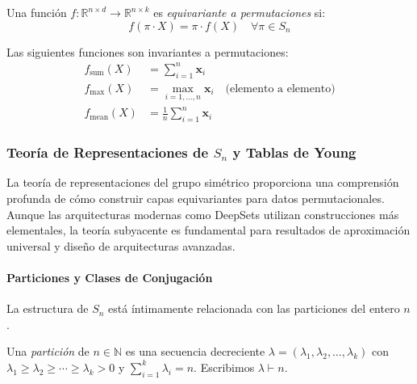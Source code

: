 \begin{definition}\label{def:permutation_equivariant_function}
Una función $f: \mathbb{R}^{n \times d} \to \mathbb{R}^{n \times k}$ es \textit{equivariante a permutaciones} si:
\begin{equation}
f(\pi \cdot X) = \pi \cdot f(X) \quad \forall \pi \in S_n
\end{equation}
\end{definition}

\begin{example}
Las siguientes funciones son invariantes a permutaciones:
\begin{align}
f_{\text{sum}}(X) &= \sum_{i=1}^n \mathbf{x}_i \\
f_{\text{max}}(X) &= \max_{i=1,\ldots,n} \mathbf{x}_i \quad \text{(elemento a elemento)} \\
f_{\text{mean}}(X) &= \frac{1}{n}\sum_{i=1}^n \mathbf{x}_i
\end{align}
\end{example}

\subsubsection{Teoría de Representaciones de $S_n$ y Tablas de Young}

La teoría de representaciones del grupo simétrico proporciona una comprensión profunda de cómo construir capas equivariantes para datos permutacionales. Aunque las arquitecturas modernas como DeepSets utilizan construcciones más elementales, la teoría subyacente es fundamental para resultados de aproximación universal y diseño de arquitecturas avanzadas.

\paragraph{Particiones y Clases de Conjugación}

La estructura de $S_n$ está íntimamente relacionada con las particiones del entero $n$.

\begin{definition}[Partición]\label{def:partition_integer}
Una \textit{partición} de $n \in \mathbb{N}$ es una secuencia decreciente $\lambda = (\lambda_1, \lambda_2, \ldots, \lambda_k)$ con $\lambda_1 \geq \lambda_2 \geq \cdots \geq \lambda_k > 0$ y $\sum_{i=1}^k \lambda_i = n$. Escribimos $\lambda \vdash n$.
\end{definition}

